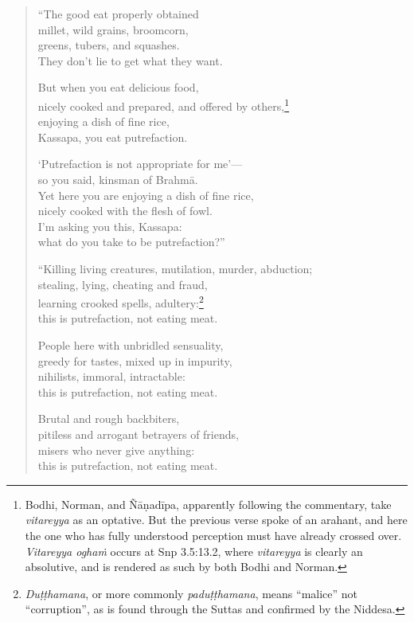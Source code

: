 \documentclass[12pt,openany]{book}%
\begin{document}
\begin{verse}%
“The good eat properly obtained \\
millet, wild grains, broomcorn, \\
greens, tubers, and squashes. \\
They don’t lie to get what they want. 

But when you eat delicious food, \\
nicely cooked and prepared, and offered by others,\footnote{Bodhi, Norman, and \textsanskrit{Ñāṇadīpa}, apparently following the commentary, take \textit{vitareyya} as an optative. But the previous verse spoke of an arahant, and here the one who has fully understood perception must have already crossed over. \textit{Vitareyya \textsanskrit{oghaṁ}} occurs at Snp 3.5:13.2, where \textit{vitareyya} is clearly an absolutive, and is rendered as such by both Bodhi and Norman. } \\
enjoying a dish of fine rice, \\
Kassapa, you eat putrefaction. 

‘Putrefaction is not appropriate for me’—\\
so you said, kinsman of \textsanskrit{Brahmā}. \\
Yet here you are enjoying a dish of fine rice, \\
nicely cooked with the flesh of fowl. \\
I’m asking you this, Kassapa: \\
what do you take to be putrefaction?” 

“Killing living creatures, mutilation, murder, abduction; \\
stealing, lying, cheating and fraud, \\
learning crooked spells, adultery:\footnote{\textit{\textsanskrit{Duṭṭhamana}}, or more commonly \textit{\textsanskrit{paduṭṭhamana}}, means “malice” not “corruption”, as is found through the Suttas and confirmed by the Niddesa. } \\
this is putrefaction, not eating meat. 

People here with unbridled sensuality, \\
greedy for tastes, mixed up in impurity, \\
nihilists, immoral, intractable: \\
this is putrefaction, not eating meat. 

Brutal and rough backbiters, \\
pitiless and arrogant betrayers of friends, \\
misers who never give anything: \\
this is putrefaction, not eating meat. 


\end{verse}
\end{document}
